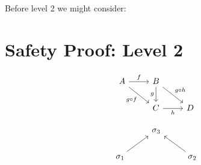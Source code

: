 \documentclass{article}
\theoremstyle{definition}
\begin{document}
\pagebreak
\pagebreak



Before level 2 we might consider:

\section{Safety Proof: Level 2}



\begin{equation}
\begin{tikzcd}
A \arrow[r,"f"]
  \arrow[dr,swap,"g\circ f"]
  &
B \arrow[dr,"g\circ h"]
  \arrow[d,swap,"g"]
  \\
  {}&
C \arrow[r,swap,"h"]
  &
D
\end{tikzcd}
\end{equation}


\begin{equation*}
\begin{tikzcd}
{}
  &
\sigma_3
  &
{}
  \\
\sigma_1
  \arrow[ur,""]
  &
{}
  &
\sigma_2
  \arrow[ul,""]
\end{tikzcd}
\end{equation*}



\fi
\end{document}
